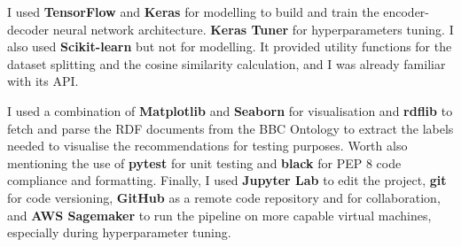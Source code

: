 I used \textbf{TensorFlow} and \textbf{Keras} for modelling to build and train the encoder-decoder neural network architecture.
\textbf{Keras Tuner} for hyperparameters tuning.
I also used \textbf{Scikit-learn} but not for modelling. It provided utility functions for the dataset splitting and
the cosine similarity calculation, and I was already familiar with its API.

I used a combination of \textbf{Matplotlib} and \textbf{Seaborn} for visualisation and \textbf{rdflib} to fetch and parse
the RDF documents from the BBC Ontology to extract the labels needed to visualise the recommendations for testing purposes.
Worth also mentioning the use of \textbf{pytest} for unit testing and \textbf{black} for PEP 8 code compliance and formatting.
Finally, I used \textbf{Jupyter Lab} to edit the project, \textbf{git} for code versioning, \textbf{GitHub} as a remote code repository
and for collaboration, and \textbf{AWS Sagemaker} to run the pipeline on more capable virtual machines, especially during hyperparameter tuning.
